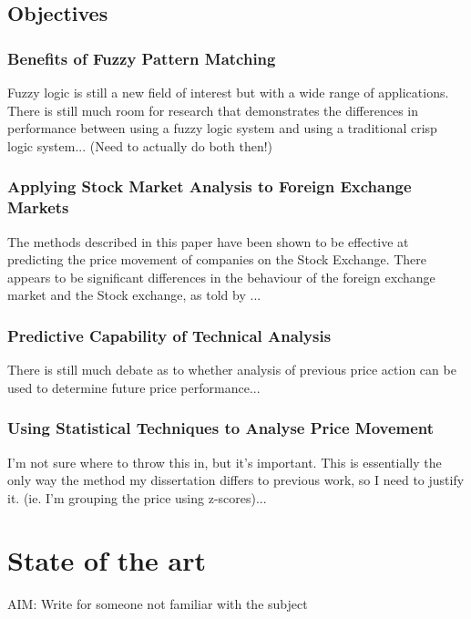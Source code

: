 \documentclass{article}
\begin{document}
\subsection{Objectives}

\subsubsection{Benefits of Fuzzy Pattern Matching}

Fuzzy logic is still a new field of interest but with a wide range of applications. There is still much room for research that demonstrates the differences in performance between using a fuzzy logic system and using a traditional crisp logic system... (Need to actually do both then!)

\subsubsection{Applying Stock Market Analysis to Foreign Exchange Markets}

The methods described in this paper have been shown to be effective at predicting the price movement of companies on the Stock Exchange. There appears to be significant differences in the behaviour of the foreign exchange market and the Stock exchange, as told by ...

\subsubsection{Predictive Capability of Technical Analysis}

There is still much debate as to whether analysis of previous price action can be used to determine future price performance...

\subsubsection{Using Statistical Techniques to Analyse Price Movement}

I'm not sure where to throw this in, but it's important. This is essentially the only way the method my dissertation differs to previous work, so I need to justify it. (ie. I'm grouping the price using z-scores)...

\section{State of the art}

AIM: Write for someone not familiar with the subject
\end{document}
